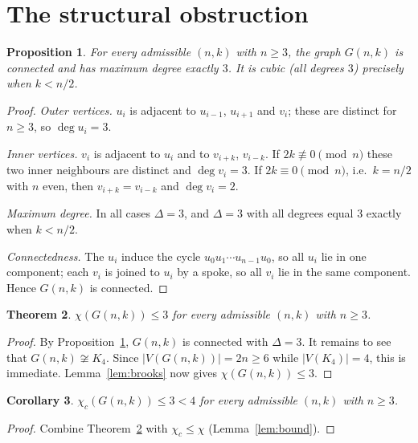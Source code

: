 \documentclass[11pt]{article}
\newtheorem{theorem}{Theorem}
\newtheorem{corollary}[theorem]{Corollary}
\newtheorem{proposition}[theorem]{Proposition}
\theoremstyle{definition}
\newcommand{\chic}{\chi_c}
\newcommand{\Gn}{G(n,k)}
\begin{document}
\section{The structural obstruction}\label{sec:structural}

\begin{proposition}\label{prop:structure}
For every admissible $(n,k)$ with $n \ge 3$, the graph $\Gn$ is connected and
has maximum degree exactly $3$. It is cubic (all degrees $3$) precisely when
$k < n/2$.
\end{proposition}

\begin{proof}
\emph{Outer vertices.} $u_i$ is adjacent to $u_{i-1}$, $u_{i+1}$ and $v_i$;
these are distinct for $n \ge 3$, so $\deg u_i = 3$.

\emph{Inner vertices.} $v_i$ is adjacent to $u_i$ and to $v_{i+k}$, $v_{i-k}$.
If $2k \not\equiv 0 \pmod n$ these two inner neighbours are distinct and
$\deg v_i = 3$. If $2k \equiv 0 \pmod n$, i.e.\ $k = n/2$ with $n$ even, then
$v_{i+k} = v_{i-k}$ and $\deg v_i = 2$.

\emph{Maximum degree.} In all cases $\Delta = 3$, and $\Delta = 3$ with all
degrees equal $3$ exactly when $k < n/2$.

\emph{Connectedness.} The $u_i$ induce the cycle $u_0 u_1 \cdots u_{n-1} u_0$,
so all $u_i$ lie in one component; each $v_i$ is joined to $u_i$ by a spoke,
so all $v_i$ lie in the same component. Hence $\Gn$ is connected.
\end{proof}

\begin{theorem}\label{thm:chi3}
$\chi(\Gn) \le 3$ for every admissible $(n,k)$ with $n \ge 3$.
\end{theorem}

\begin{proof}
By Proposition~\ref{prop:structure}, $\Gn$ is connected with $\Delta = 3$. It
remains to see that $\Gn \not\cong K_4$. Since $|V(\Gn)| = 2n \ge 6$ while
$|V(K_4)| = 4$, this is immediate. Lemma~\ref{lem:brooks} now gives
$\chi(\Gn) \le 3$.
\end{proof}

\begin{corollary}\label{cor:no4}
$\chic(\Gn) \le 3 < 4$ for every admissible $(n,k)$ with $n \ge 3$.
\end{corollary}

\begin{proof}
Combine Theorem~\ref{thm:chi3} with $\chic \le \chi$
(Lemma~\ref{lem:bound}).
\end{proof}
\end{document}
